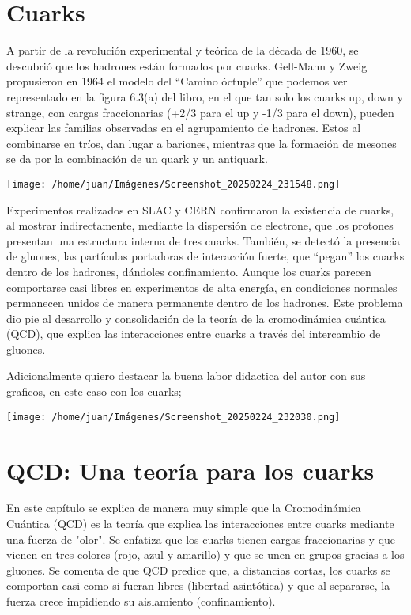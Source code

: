 \documentclass[12pt]{article}
\begin{document}
\section{Cuarks}
A partir de la revolución experimental y teórica de la década de 1960, se descubrió que los hadrones están formados por cuarks. Gell-Mann y Zweig propusieron en 1964 el modelo del “Camino óctuple” que podemos ver representado en la figura 6.3(a) del libro, en el que tan solo los cuarks up, down y strange, con cargas fraccionarias (+2/3 para el up y -1/3 para el down), pueden explicar las familias observadas en el agrupamiento de hadrones. Estos al combinarse en tríos, dan lugar a bariones, mientras que la formación de mesones se da por la combinación de un quark y un antiquark. 

\begin{center}
\texttt{[image: /home/juan/Imágenes/Screenshot\_20250224\_231548.png]}
\end{center}

Experimentos realizados en SLAC y CERN confirmaron la existencia de cuarks, al mostrar indirectamente, mediante la dispersión de electrone, que los protones presentan una estructura interna de tres cuarks. También, se detectó la presencia de gluones, las partículas portadoras de interacción fuerte, que “pegan” los cuarks dentro de los hadrones, dándoles confinamiento. Aunque los cuarks parecen comportarse casi libres en experimentos de alta energía, en condiciones normales permanecen unidos de manera permanente dentro de los hadrones. Este problema dio pie al desarrollo y consolidación de la teoría de la cromodinámica cuántica (QCD), que explica las interacciones entre cuarks a través del intercambio de gluones.

Adicionalmente quiero destacar la buena labor didactica del autor con sus graficos, en este caso con los cuarks;

\begin{center}
\texttt{[image: /home/juan/Imágenes/Screenshot\_20250224\_232030.png]}
\end{center}

\section{QCD: Una teoría para los cuarks}
En este capítulo se explica de manera muy simple que la Cromodinámica Cuántica (QCD) es la teoría que explica las interacciones entre cuarks mediante una fuerza de "olor". Se enfatiza que los cuarks tienen cargas fraccionarias y que vienen en tres colores (rojo, azul y amarillo) y que se unen en grupos gracias a los gluones. Se comenta de que QCD predice que, a distancias cortas, los cuarks se comportan casi como si fueran libres (libertad asintótica) y que al separarse, la fuerza crece impidiendo su aislamiento (confinamiento).
\end{document}
